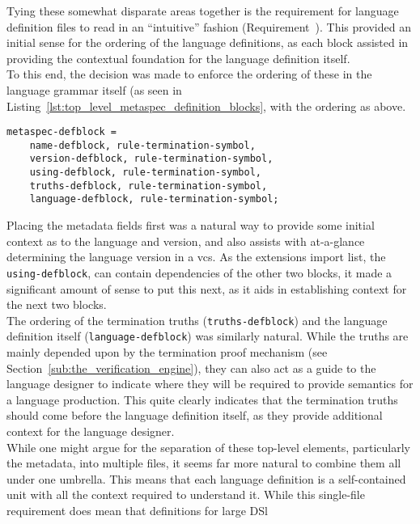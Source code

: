 Tying these somewhat disparate areas together is the requirement for language definition files to read in an ``intuitive'' fashion (Requirement~). 
This provided an initial sense for the ordering of the language definitions, as each block assisted in providing the contextual foundation for the language definition itself. \\

To this end, the decision was made to enforce the ordering of these in the language grammar itself (as seen in Listing~\ref{lst:top_level_metaspec_definition_blocks}, with the ordering as above.
\begin{lstlisting}[caption={Top-Level Metaspec Definition Blocks}, label={lst:top_level_metaspec_definition_blocks}, firstnumber=156]
metaspec-defblock = 
    name-defblock, rule-termination-symbol, 
    version-defblock, rule-termination-symbol, 
    using-defblock, rule-termination-symbol, 
    truths-defblock, rule-termination-symbol, 
    language-defblock, rule-termination-symbol;
\end{lstlisting}

Placing the metadata fields first was a natural way to provide some initial context as to the language and version, and also assists with at-a-glance determining the language version in a \gls{vcs}.
As the extensions import list, the \lstinline{using-defblock}, can contain dependencies of the other two blocks, it made a significant amount of sense to put this next, as it aids in establishing context for the next two blocks.\\

The ordering of the termination truths (\lstinline{truths-defblock}) and the language definition itself (\lstinline{language-defblock}) was similarly natural. 
While the truths are mainly depended upon by the termination proof mechanism (see Section~\ref{sub:the_verification_engine}), they can also act as a guide to the language designer to indicate where they will be required to provide semantics for a language production. 
This quite clearly indicates that the termination truths should come before the language definition itself, as they provide additional context for the language designer.\\

While one might argue for the separation of these top-level elements, particularly the metadata, into multiple files, it seems far more natural to combine them all under one umbrella.
This means that each language definition is a self-contained unit with all the context required to understand it. 
While this single-file requirement does mean that definitions for large DSl

